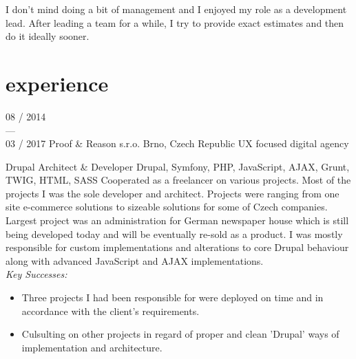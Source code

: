 \documentclass[]{friggeri-cv} %
\begin{document}
I don't mind doing a bit of management and I enjoyed my role as a development lead.
After leading a team for a while, I try to provide exact estimates and then do it ideally sooner.
\bigskip

\section{experience}
\begin{entrylist}
  \job
  {08 / 2014 \\ --- \\ 03 / 2017}
  {Proof \& Reason s.r.o.}
  {Brno, Czech Republic}
  {UX focused digital agency}
  {
    \position
    {Drupal Architect \& Developer}
    {Drupal, Symfony, PHP, JavaScript, AJAX, Grunt, TWIG, HTML, SASS}
    {
      Cooperated as a freelancer on various projects. Most of the projects I was the sole developer and architect.
      Projects were ranging from one site e-commerce solutions to sizeable solutions for some of Czech companies.
      Largest project was an administration for German newspaper house which is still being developed today and will
      be eventually re-sold as a product. I was mostly responsible for custom implementations and alterations to
      core Drupal behaviour along with advanced JavaScript and AJAX implementations.
    }\\
    \emph{Key Successes:}
    \begin{itemize}
      \item Three projects I had been responsible for were deployed on time and in accordance with the client's requirements.
      \item Culsulting on other projects in regard of proper and clean 'Drupal' ways of implementation and architecture.
    \end{itemize}
  }
\end{entrylist}
\end{document}
